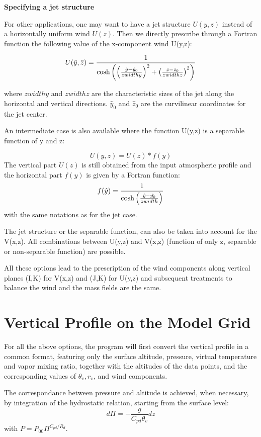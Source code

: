 {\bf Specifying a jet structure}

For other applications, one may want to have a jet structure $U(y,z)$ instead
of a horizontally uniform wind $U(z)$. Then we directly prescribe through
a Fortran function the following  value of the x-component wind U(y,z):

\begin{equation}
U(\hat{y},\hat{z})= { 1 \over \cosh \left(
  \left( { \hat{y} - \hat{y}_0 \over zwidthy } \right) ^2 +
  \left( { \hat{z} - \hat{z}_0 \over zwidthz } \right) ^2
 \right) }
\end{equation}

where $ zwidthy$ and  $ zwidthz $ are the characteristic sizes of the jet along
the horizontal and vertical directions. $\hat{y}_0$ and $\hat{z}_0$ are the
curvilinear coordinates  for the jet center.

An intermediate case is also available where the function U(y,z) is a separable
function of y and z:

$$ U(y,z) = U(z) * f(y)$$
 The vertical part $ U(z)$  is still obtained from the input atmospheric profile and
the horizontal part $f(y)$ is given by a Fortran function:
\begin{equation}
 f(\hat{y}) = { 1 \over \cosh \left(
   { \hat{y} - \hat{y_0} \over zwidth } \right) }
\end{equation}
with the same notations as for the jet case.

The jet structure or the separable function, can also be taken into account for
the V(x,z). All combinations between U(y,z) and V(x,z) (function of only z,
separable or non-separable function) are possible.


All these options lead to the prescription of the wind components along vertical
planes (I,K) for V(x,z) and (J,K) for U(y,z) and subsequent treatments
to balance the wind and the mass fields are the same.

\section{Vertical Profile on the Model Grid}

For all the above options, the program will first convert the vertical profile
 in a common format, featuring only the surface altitude, pressure, virtual
temperature and vapor mixing ratio, together with the altitudes of the
data points, and the corresponding values of $\theta_v, r_v$, and wind
components.

The correspondance between pressure and altitude is achieved, when necessary,
by integration of the hydrostatic relation, starting from the surface level:
\begin{equation}
d \Pi = - \dfrac{g}{C_{pd} \theta_{v}}  dz
\end{equation}
with $P = P_{00} \Pi^{C_{pd}/R_{d}} $.

